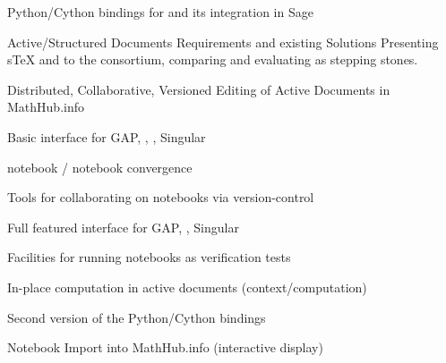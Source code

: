 \begin{workpackage}
\begin{wpdelivs}
  \begin{wpdeliv}[due=18,id=pari-python-lib1,dissem=PU,nature=OTHER,lead=UB,issue=83]
	  {Python/Cython bindings for \Pari and its integration in Sage}
  \end{wpdeliv}
  \begin{wpdeliv}[id=adstex,due=9,miles=startup,nature=R,dissem=PU,lead=JU,issue=91]
    {Active/Structured Documents Requirements and existing Solutions} Presenting sTeX and
    \Jupyter to the consortium, comparing and evaluating as stepping stones.
  \end{wpdeliv}
    \begin{wpdeliv}[id=mathhub-editing,due=18,miles=startup,nature=DEM,dissem=PU,lead=FAU,issue=92]
      {Distributed, Collaborative, Versioned Editing of Active Documents in MathHub.info}
    \end{wpdeliv}
  \begin{wpdeliv}[due=12,miles=proto1,id=ipython-kernels-basic,dissem=PU,nature=OTHER,lead=PS,issue=93]
      {Basic \Jupyter interface for GAP, \PariGP, \Sage, Singular}
  \end{wpdeliv}
  \begin{wpdeliv}[due=12,id=ipython-kernel-sage,miles=startup,dissem=PU,nature=DEM,lead=PS,issue=94]
      {\Sage notebook / \Jupyter notebook convergence}
  \end{wpdeliv}
  \begin{wpdeliv}[due=12,id=jupyter-collab,miles=startup,dissem=PU,nature=OTHER,lead=SR,issue=95]
      {Tools for collaborating on notebooks via version-control}
  \end{wpdeliv}
  \begin{wpdeliv}[due=24,id=ipython-kernels,miles=startup,dissem=PU,nature=OTHER,lead=PS,issue=96]
      {Full featured \Jupyter interface for GAP, \PariGP, Singular}
  \end{wpdeliv}
  \begin{wpdeliv}[due=18,miles=proto1,id=jupyter-test,dissem=PU,nature=OTHER,lead=SR,issue=98]
      {Facilities for running notebooks as verification tests}
  \end{wpdeliv}
  \begin{wpdeliv}[id=adcomp,due=18,miles=proto1,nature=DEM,dissem=PU,lead=JU,issue=97]
    {In-place computation in active documents (context/computation)}
  \end{wpdeliv}
  \begin{wpdeliv}[due=36,miles=proto1,id=pari-python-lib2,dissem=PU,nature=OTHER,lead=UB,issue=84]
	  {Second version of the \Pari Python/Cython bindings}
  \end{wpdeliv}
    \begin{wpdeliv}[id=jupyter-import,due=24,miles=proto1,nature=DEM,dissem=PU,lead=FAU,issue=85]
      {Notebook Import into MathHub.info (interactive display)}
    \end{wpdeliv}


\end{wpdelivs}
\end{workpackage}
